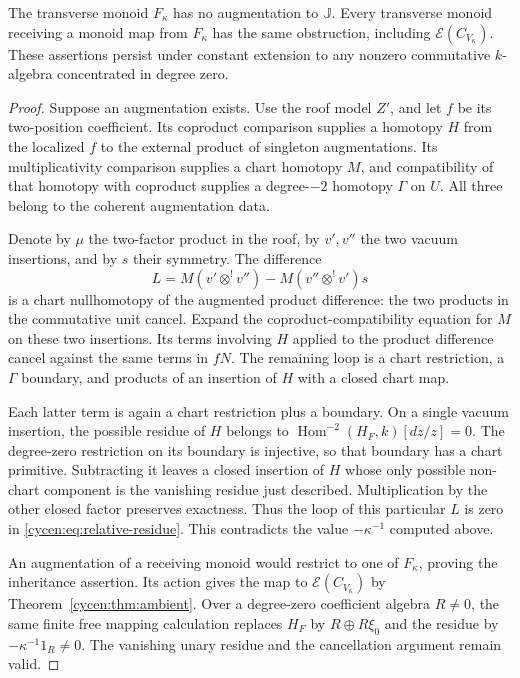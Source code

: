 \begin{theorem}\label{cycen:thm:no-augmentation}
The transverse monoid $F_\kappa$ has no augmentation to
$\mathbb J$. Every transverse monoid receiving a monoid
map from $F_\kappa$ has the same obstruction, including
$\mathcal E(C_{V_\kappa})$. These assertions persist under
constant extension to any nonzero commutative $k$-algebra
concentrated in degree zero.
\end{theorem}
\begin{proof}
Suppose an augmentation exists. Use the roof model $Z'$,
and let $f$ be its two-position coefficient. Its coproduct
comparison supplies a homotopy $H$ from the localized $f$
to the external product of singleton augmentations.
Its multiplicativity comparison supplies a chart homotopy
$M$, and compatibility of that homotopy with coproduct
supplies a degree-$-2$ homotopy $\Gamma$ on $U$.
All three belong to the coherent augmentation data.

Denote by $\mu$ the two-factor product in the roof, by
$v',v''$ the two vacuum insertions, and by $s$ their symmetry.
The difference
\[
 L=M(v'\otimes^!v'')-M(v''\otimes^!v')s
\]
is a chart nullhomotopy of the augmented product difference:
the two products in the commutative unit cancel.
Expand the coproduct-compatibility equation for $M$ on
these two insertions. Its terms involving $H$ applied to
the product difference cancel against the same terms in
$fN$. The remaining loop is a chart restriction, a
$\Gamma$ boundary, and products of an insertion of $H$
with a closed chart map.

Each latter term is again a chart restriction plus a
boundary. On a single vacuum insertion, the possible
residue of $H$ belongs to
$\operatorname{Hom}^{-2}(H_F,k)[dz/z]=0$.
The degree-zero restriction on its boundary is injective,
so that boundary has a chart primitive. Subtracting it
leaves a closed insertion of $H$ whose only possible
non-chart component is the vanishing residue just described.
Multiplication by the other closed factor preserves exactness.
Thus the loop of this particular $L$ is zero in
\eqref{cycen:eq:relative-residue}. This contradicts the
value $-\kappa^{-1}$ computed above.

An augmentation of a receiving monoid would restrict to
one of $F_\kappa$, proving the inheritance assertion.
Its action gives the map to $\mathcal E(C_{V_\kappa})$
by Theorem~\ref{cycen:thm:ambient}. Over a degree-zero
coefficient algebra $R\ne0$, the same finite free mapping
calculation replaces $H_F$ by $R\oplus R\xi_0$ and the
residue by $-\kappa^{-1}1_R\ne0$. The vanishing unary
residue and the cancellation argument remain valid.
\end{proof}

